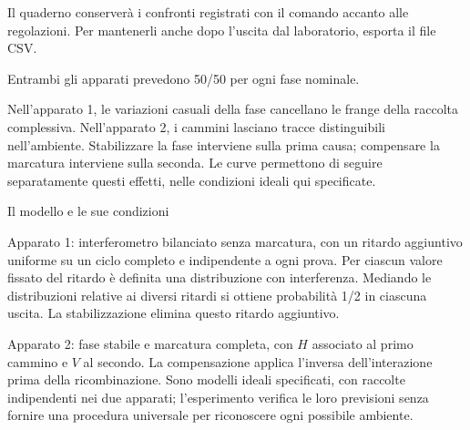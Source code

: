 Il quaderno conserverà i confronti registrati con il comando accanto alle regolazioni. Per mantenerli anche dopo l'uscita dal laboratorio, esporta il file CSV.\par


Entrambi gli apparati prevedono 50/50 per ogni fase nominale.\par

Nell'apparato 1, le variazioni casuali della fase cancellano le frange della raccolta complessiva. Nell'apparato 2, i cammini lasciano tracce distinguibili nell'ambiente. Stabilizzare la fase interviene sulla prima causa; compensare la marcatura interviene sulla seconda. Le curve permettono di seguire separatamente questi effetti, nelle condizioni ideali qui specificate.\par


Il modello e le sue condizioni\par

Apparato 1: interferometro bilanciato senza marcatura, con un ritardo aggiuntivo uniforme su un ciclo completo e indipendente a ogni prova. Per ciascun valore fissato del ritardo è definita una distribuzione con interferenza. Mediando le distribuzioni relative ai diversi ritardi si ottiene probabilità 1/2 in ciascuna uscita. La stabilizzazione elimina questo ritardo aggiuntivo.\par

Apparato 2: fase stabile e marcatura completa, con \(H\) associato al primo cammino e \(V\) al secondo. La compensazione applica l'inversa dell'interazione prima della ricombinazione. Sono modelli ideali specificati, con raccolte indipendenti nei due apparati; l'esperimento verifica le loro previsioni senza fornire una procedura universale per riconoscere ogni possibile ambiente.\par




